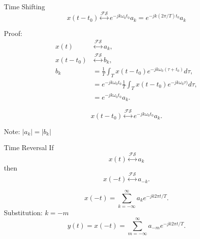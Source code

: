 \begin{frame}[plain]{Time Shifting}
    \begin{equation}
        x(t-t_0) \overset{\mathcal{FS}}{\longleftrightarrow} e^{-jk\omega_0 t_0}a_k = e^{-jk(2\pi/T) t_0}a_k
    \end{equation}
    {
        \noindent Proof:\\%
        \pause
        \begin{equation*}
            \begin{aligned}
          x(t) &\overset{\mathcal{FS}}{\longleftrightarrow} a_k,\\            
            x(t-t_0) &\overset{\mathcal{FS}}{\longleftrightarrow} b_k,\\
                b_k &=  \frac{1}{T}\int_{T}x(t-t_0)e^{-jk\omega_0 (\tau + t_0)}d\tau,\\
                &= e^{-jk\omega_0  t_0}\frac{1}{T}\int_{T}x(t-t_0)e^{-jk\omega_0\tau)}d\tau,\\
                &= e^{-jk\omega_0  t_0}a_k.
            \end{aligned}
        \end{equation*}
        
        \begin{equation*}
             x(t-t_0) \overset{\mathcal{FS}}{\longleftrightarrow} e^{-jk\omega_0  t_0}a_k.
        \end{equation*}

        Note: $|a_k| = |b_k|$
    }
\end{frame}


\begin{frame}{Time Reversal}
    If
    \begin{equation}
        x(t) \overset{\mathcal{FS}}{\longleftrightarrow} a_k
    \end{equation}
    then
    \begin{equation}
        x(-t) \overset{\mathcal{FS}}{\longleftrightarrow} a_{-k}.
    \end{equation}
    {
        \begin{equation}
            x(-t) =  \sum_{k=-\infty}^{\infty}a_ke^{-jk2\pi t/T}.
        \end{equation}
        Substitution: $k=-m$
        \begin{equation*}
            y(t) = x(-t) = \sum_{m=-\infty}^{\infty}a_{-m}e^{-jk2\pi t/T}.
        \end{equation*}
        \pause
        
    }
\end{frame}

